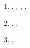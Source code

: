 \documentclass[a4paper]{article}
\newcommand\liststyleLv{%
\renewcommand\theenumi{\arabic{enumi}}
\renewcommand\theenumii{\arabic{enumii}}
\renewcommand\theenumiii{\arabic{enumiii}}
\renewcommand\theenumiv{\arabic{enumiv}}
\renewcommand\labelenumi{\theenumi.}
\renewcommand\labelenumii{\theenumii.}
\renewcommand\labelenumiii{\theenumiii.}
\renewcommand\labelenumiv{\theenumiv.}
}
\begin{document}
\liststyleLv
\begin{enumerate}
\item {
{\CYRV} {\cyrp}{\cyre}{\cyrr}{\cyrv}{\cyro}{\cyrm} {\cyrc}{\cyri}{\cyrk}{\cyrl}{\cyre},
{\cyrp}{\cyrr}{\cyro}{\cyri}{\cyrs}{\cyrh}{\cyro}{\cyrd}{\cyri}{\cyrt}
{\cyro}{\cyrs}{\cyrn}{\cyro}{\cyrv}{\cyrn}{\cyra}{\cyrya}
{\cyrm}{\cyra}{\cyrr}{\cyrk}{\cyri}{\cyrr}{\cyro}{\cyrv}{\cyrk}{\cyra}
{\cyri}{\cyrz}{\cyro}{\cyrb}{\cyrr}{\cyra}{\cyrzh}{\cyre}{\cyrn}{\cyri}{\cyrya} {\cyrn}{\cyra}
{\cyro}{\cyrs}{\cyrn}{\cyro}{\cyrv}{\cyre} {\cyrd}{\cyra}{\cyrn}{\cyrn}{\cyrery}{\cyrh}
{\cyrs}{\cyro}{\cyrs}{\cyre}{\cyrd}{\cyrn}{\cyri}{\cyrh} {\cyrp}{\cyri}{\cyrk}{\cyrs}{\cyre}{\cyrl}{\cyre}{\cyrishrt}.
{\CYRP}{\cyrr}{\cyri} {\cyrn}{\cyre}{\cyro}{\cyrb}{\cyrh}{\cyro}{\cyrd}{\cyri}{\cyrm}{\cyro}{\cyrs}{\cyrt}{\cyri},
{\cyrk}{\cyro}{\cyrm}{\cyrp}{\cyro}{\cyrn}{\cyre}{\cyrn}{\cyrt}{\cyrery}
{\cyrd}{\cyro}{\cyrb}{\cyra}{\cyrv}{\cyrl}{\cyrya}{\cyryu}{\cyrt}{\cyrs}{\cyrya} {\cyrv}
{\cyrt}{\cyra}{\cyrb}{\cyrl}{\cyri}{\cyrc}{\cyru}
{\cyrerev}{\cyrk}{\cyrv}{\cyri}{\cyrv}{\cyra}{\cyrl}{\cyre}{\cyrn}{\cyrt}{\cyrn}{\cyro}{\cyrs}{\cyrt}{\cyri}.}
\item {
{\CYRV}{\cyro} {\cyrv}{\cyrt}{\cyro}{\cyrr}{\cyro}{\cyrm} {\cyrc}{\cyri}{\cyrk}{\cyrl}{\cyre}
{\cyrp}{\cyrr}{\cyro}{\cyri}{\cyrs}{\cyrh}{\cyro}{\cyrd}{\cyri}{\cyrt}
{\cyrp}{\cyrr}{\cyri}{\cyrm}{\cyre}{\cyrn}{\cyre}{\cyrn}{\cyri}{\cyre}
{\cyrt}{\cyra}{\cyrb}{\cyrl}{\cyri}{\cyrc}{\cyrery}
{\cyrerev}{\cyrk}{\cyrv}{\cyri}{\cyrv}{\cyra}{\cyrl}{\cyre}{\cyrn}{\cyrt}{\cyrn}{\cyro}{\cyrs}{\cyrt}{\cyri} {\cyrk}
{\cyrk}{\cyra}{\cyrzh}{\cyrd}{\cyro}{\cyrm}{\cyru} {\cyrp}{\cyri}{\cyrk}{\cyrs}{\cyre}{\cyrl}{\cyryu}
{\cyri}{\cyrz}{\cyro}{\cyrb}{\cyrr}{\cyra}{\cyrzh}{\cyre}{\cyrn}{\cyri}{\cyrya}.
{\CYRT}{\cyra}{\cyrb}{\cyrl}{\cyri}{\cyrc}{\cyra}
{\cyrerev}{\cyrk}{\cyrv}{\cyri}{\cyrv}{\cyra}{\cyrl}{\cyre}{\cyrn}{\cyrt}{\cyrn}{\cyro}{\cyrs}{\cyrt}{\cyri}
{\cyrp}{\cyrr}{\cyre}{\cyrd}{\cyrv}{\cyra}{\cyrr}{\cyri}{\cyrt}{\cyre}{\cyrl}{\cyrsftsn}{\cyrn}{\cyro}
{\cyrs}{\cyro}{\cyrr}{\cyrt}{\cyri}{\cyrr}{\cyru}{\cyre}{\cyrt}{\cyrs}{\cyrya} {\cyrv}{\cyro}
{\cyri}{\cyrz}{\cyrb}{\cyre}{\cyrzh}{\cyra}{\cyrn}{\cyri}{\cyrya}
{\cyrk}{\cyro}{\cyrn}{\cyrf}{\cyrl}{\cyri}{\cyrk}{\cyrt}{\cyro}{\cyrv}
{\cyrp}{\cyro}{\cyrr}{\cyrya}{\cyrd}{\cyrk}{\cyra}.}
\item {
\foreignlanguage{russian}{{\CYRV} {\cyrt}{\cyrr}{\cyre}{\cyrt}{\cyrsftsn}{\cyre}{\cyrm}
{\cyrc}{\cyri}{\cyrk}{\cyrl}{\cyre}, {\cyrp}{\cyrr}{\cyro}{\cyri}{\cyrs}{\cyrh}{\cyro}{\cyrd}{\cyri}{\cyrt}
}}
\end{enumerate}
\end{document}
